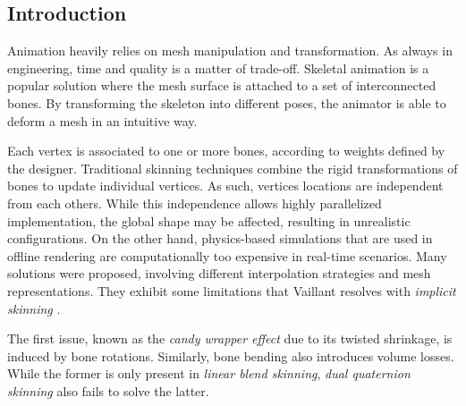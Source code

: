 \documentclass[a4paper,10pt]{article}
\begin{document}
\begin{multicols}{2}


\section{Introduction}

Animation heavily relies on mesh manipulation and transformation.
As always in engineering, time and quality is a matter of trade-off.
Skeletal animation is a popular solution where the mesh surface is attached to a set of interconnected bones.
By transforming the skeleton into different poses, the animator is able to deform a mesh in an intuitive way.

Each vertex is associated to one or more bones, according to weights defined by the designer.
Traditional skinning techniques combine the rigid transformations of bones to update individual vertices.
As such, vertices locations are independent from each others.
While this independence allows highly parallelized implementation, the global shape may be affected, resulting in unrealistic configurations.
On the other hand, physics-based simulations that are used in offline rendering are computationally too expensive in real-time scenarios.
Many solutions were proposed, involving different interpolation strategies and mesh representations.
They exhibit some limitations that Vaillant resolves with \emph{implicit skinning} \cite{Vaillant:2013}.

The first issue, known as the \emph{candy wrapper effect} due to its twisted shrinkage, is induced by bone rotations.
Similarly, bone bending also introduces volume losses.
While the former is only present in \emph{linear blend skinning}, \emph{dual quaternion skinning} \cite{Kavan:2008} also fails to solve the latter.


\end{multicols}
\end{document}
